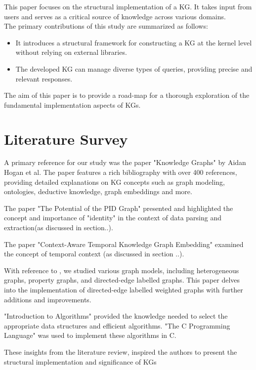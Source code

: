 \documentclass[conference]{IEEEtran}
\begin{document}
This paper focuses on the structural implementation of a KG. It takes input from users and serves as a critical source of knowledge across various domains. 
\\
The primary contributions of this study are summarized as follows:

\begin{itemize}
    \item It introduces a structural framework for constructing a KG at the kernel level without relying on external libraries.
    \item The developed KG can manage diverse types of queries, providing precise and relevant responses.
\end{itemize}

The aim of this paper is to provide a road-map for a thorough exploration of the fundamental implementation aspects of KGs.


\section{Literature Survey}

A primary reference for our study was the paper "Knowledge Graphs"\cite{b8} by Aidan Hogan et al. The paper features a rich bibliography with over 400 references, providing detailed explanations on KG concepts such as graph modeling, ontologies, deductive knowledge, graph embeddings and more. 

The paper "The Potential of the PID Graph" \cite{b16} presented and highlighted the concept and importance of "identity" in the context of data parsing and extraction(as discussed in section..).

The paper "Context-Aware Temporal Knowledge Graph Embedding" \cite{b17} examined the concept of temporal context (as discussed in section ..).

With reference to \cite{b8}, we studied various graph models, including heterogeneous graphs\cite{b18}, property graphs\cite{b12}, and directed-edge labelled graphs\cite{b8}. This paper delves into the implementation of directed-edge labelled weighted graphs with further additions and improvements.

"Introduction to Algorithms" \cite{b14} provided the knowledge needed to select the appropriate data structures and efficient algorithms. "The C Programming Language" \cite{b9} was used to implement these algorithms in C.

These insights from the literature review, inspired the authors to present the structural implementation and significance of KGs
\end{document}
